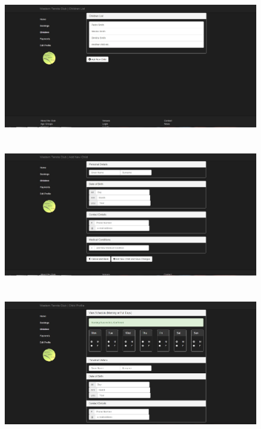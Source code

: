 \documentclass{l3proj}
\begin{document}
{
\begin{figure}[h]
\includegraphics[scale=0.35]{parenttemplate6.jpg}
\\
\\
\\
\includegraphics[scale=0.35]{parenttemplate5.jpg}
\\
\\
\\
\includegraphics[scale=0.35]{parenttemplate4.jpg}
\end{figure}
}




\end{document}
